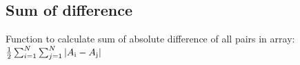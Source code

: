 \subsection{Sum of difference}

Function to calculate sum of absolute difference of all pairs in array: $ \frac{1}{2} \sum_{i=1}^{N}\sum_{j=1}^{N} |A\textsubscript{i} - A\textsubscript{j}|$